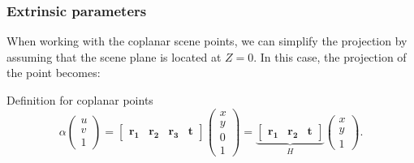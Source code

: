 \documentclass{beamer}
\begin{document}
\begin{frame}
	\frametitle{Extrinsic parameters}

	When working with the coplanar scene points, we can simplify the projection
	by assuming that the scene plane is located at \(Z = 0\). In this case, the
	projection of the point becomes:
	\begin{exampleblock}{Definition for coplanar points}
		\begin{equation*}
			\alpha \begin{pmatrix}
				u \\ v \\ 1
			\end{pmatrix} = \begin{bmatrix}
				\mathbf{r_1} & \mathbf{r_2} & \mathbf{r_3} & \mathbf{t}
			\end{bmatrix} \begin{pmatrix}
				x \\ y \\ 0 \\ 1
			\end{pmatrix} = \underbrace{\begin{bmatrix}
					\mathbf{r_1} & \mathbf{r_2} & \mathbf{t}
				\end{bmatrix}}_{H} \begin{pmatrix}
				x \\ y \\ 1
			\end{pmatrix}.
		\end{equation*}
	\end{exampleblock}
\end{frame}
\end{document}
